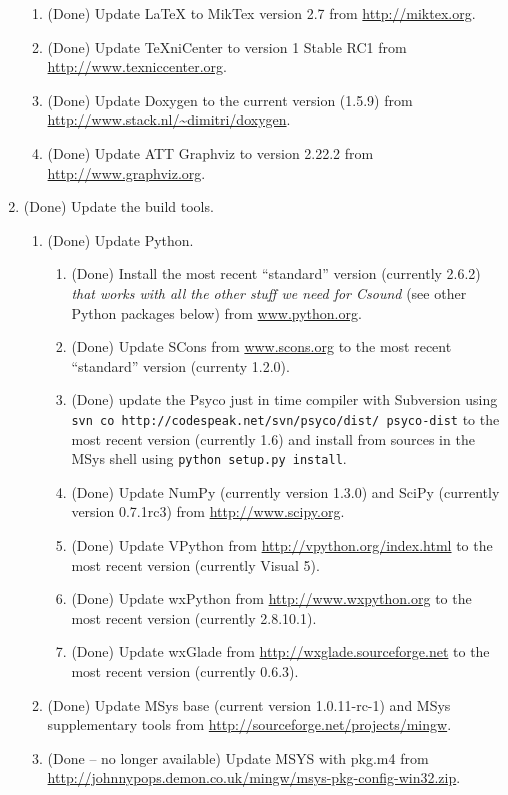 \documentclass[11pt,letterpaper,onecolumn]{scrartcl}
\begin{document}
\begin{sloppypar}
\begin{enumerate}
\begin{enumerate}
	    \item (Done) Update LaTeX to MikTex version 2.7 from \url{http://miktex.org}.
	    \item (Done) Update TeXniCenter to version 1 Stable RC1 from \url{http://www.texniccenter.org}. 
	    \item (Done) Update Doxygen to the current version (1.5.9) from \url{http://www.stack.nl/~dimitri/doxygen}.
	    \item (Done) Update ATT Graphviz to version 2.22.2 from \url{http://www.graphviz.org}.
		\end{enumerate}
	\item (Done) Update the build tools.   
		\begin{enumerate}
  		\item (Done) Update Python.
				\begin{enumerate}
					\item (Done) Install the most recent ``standard'' version (currently 2.6.2) \emph{that works with all the other stuff we need for Csound} (see other Python packages below) from \url{www.python.org}.
	    		\item (Done) Update SCons from \url{www.scons.org} to the most recent ``standard'' version (currenty 1.2.0).
	    	  \item (Done) update the Psyco just in time compiler with Subversion using \verb|svn co http://codespeak.net/svn/psyco/dist/ psyco-dist|  to the most recent version (currently 1.6) and install from sources in the MSys shell using \verb|python setup.py install|.
	    		\item (Done) Update NumPy (currently version 1.3.0) and SciPy (currently version 0.7.1rc3) from \url{http://www.scipy.org}.
	    		\item (Done) Update VPython from \url{http://vpython.org/index.html} to the most recent version (currently Visual 5).
	    		\item (Done) Update wxPython from \url{http://www.wxpython.org} to the most recent version (currently 2.8.10.1).
	    		\item (Done) Update wxGlade from \url{http://wxglade.sourceforge.net} to the most recent version (currently 0.6.3).
				\end{enumerate}
			\item (Done) Update MSys base (current version 1.0.11-rc-1) and MSys supplementary tools from \url{http://sourceforge.net/projects/mingw}. 
			\item (Done -- no longer available) Update MSYS with pkg.m4 from \url{http://johnnypops.demon.co.uk/mingw/msys-pkg-config-win32.zip}. 

\end{enumerate}
\end{enumerate}
\end{sloppypar}
\end{document}
